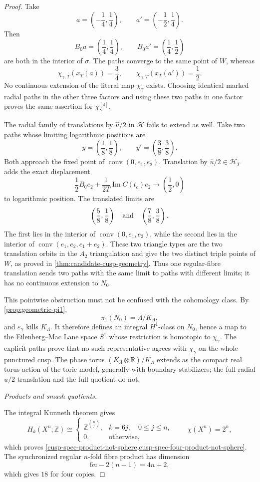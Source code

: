 \begin{proof}
Take
\[
 a=\left(-\frac14,\frac14\right),\qquad
 a'=\left(-\frac12,\frac14\right).
\]
Then
\[
 B_0a=\left(\frac14,\frac14\right),\qquad
 B_0a'=\left(\frac14,\frac12\right)
\]
are both in the interior of \(\sigma\).  The paths converge to the same
point of \(W\), whereas
\[
 \chi_{\gamma,T}(x_T(a))=\frac34,\qquad
 \chi_{\gamma,T}(x_T(a'))=\frac12.
\]
No continuous extension of the literal map \(\chi_\gamma\) exists.
Choosing identical marked radial paths in the other three factors and
using these two paths in one factor proves the same assertion for
\(\chi_\gamma^{[4]}\).

The radial family of translations by \(\widehat u/2\) in \(\mathcal H\)
fails to extend as well.  Take two paths
whose limiting logarithmic positions are
\[
 y=\left(\frac18,\frac18\right),\qquad
 y'=\left(\frac38,\frac38\right).
\]
Both approach the fixed point of
\(\operatorname{conv}(0,e_1,e_2)\).  Translation by
\(\widehat u/2\in\mathcal H_T\) adds the exact displacement
\[
 \frac12B_0e_2+
 \frac1{2T}\operatorname{Im}C(t_c)e_2
 \longrightarrow\left(\frac12,0\right)
\]
to logarithmic position.  The translated limits are
\[
 \left(\frac58,\frac18\right)
 \quad\hbox{and}\quad
 \left(\frac78,\frac38\right).
\]
The first lies in the interior of
\(\operatorname{conv}(0,e_1,e_2)\), while the second lies in the interior
of \(\operatorname{conv}(e_1,e_2,e_1+e_2)\).  These two triangle types are
the two translation orbits in the \(A_2\) triangulation and give the two
distinct triple points of \(W\), as proved in
\cref{thm:candidate-cusp-geometry}.  Thus one regular-fibre translation
sends two paths with the same limit to paths with different limits; it has
no continuous extension to \(N_0\).

This pointwise obstruction must not be confused with the cohomology class.
By \cref{prop:geometric-pi1},
\[
 \pi_1(N_0)=\Lambda/K_\Lambda,
\]
and \(\varepsilon_\gamma\) kills \(K_\Lambda\).  It therefore defines an
integral \(H^1\)-class on \(N_0\), hence a map to the Eilenberg--Mac Lane
space \(S^1\) whose restriction is homotopic to \(\chi_\gamma\).  The
explicit paths prove that no such representative agrees with
\(\chi_\gamma\) on the whole punctured cusp.  The phase torus
\((K_\Lambda\otimes\mathbb R)/K_\Lambda\) extends as the compact real torus
action of the toric model, generally with boundary stabilizers; the full
radial \(\widehat u/2\)-translation and the full quotient do not.

\medskip\noindent\emph{Products and smash quotients.}\par
The integral Kunneth theorem gives
\[
 H_k(X^n;\mathbb Z)\cong
 \begin{cases}
  \mathbb Z^{\binom nj},&k=6j,\quad0\le j\le n,\\
  0,&\text{otherwise},
 \end{cases}
 \qquad \chi(X^n)=2^n,
\]
which proves
\cref{cusp-spec-product-not-sphere,cusp-spec-four-product-not-sphere}.
The synchronized regular \(n\)-fold fibre product has dimension
\[
 6n-2(n-1)=4n+2,
\]
which gives \(18\) for four copies.


\end{proof}
